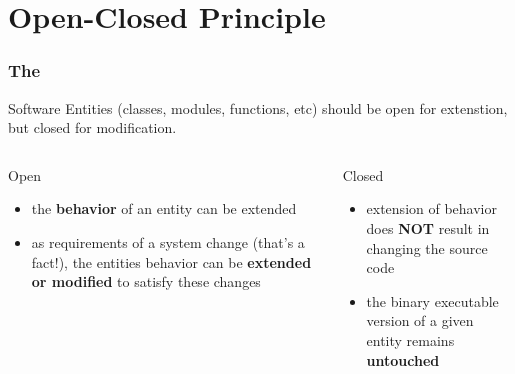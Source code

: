 \documentclass[9pt]{beamer}
\begin{document}
\section{Open-Closed Principle}
\begin{frame}
  \frametitle{The \secname}
  \begin{theorem}
    Software Entities (classes, modules, functions, etc) should be open for extenstion, but closed for modification.
  \end{theorem}
\vfill
\pause
  \begin{columns}[t]
    \begin{column}{.48\textwidth}
       \begin{block}{Open}
         \begin{itemize}
         \item<3-> the \textbf{behavior} of an entity can be extended
         \item<3-> as requirements of a system change (that's a fact!), the entities behavior can be \textbf{extended or modified} to satisfy these changes
         \end{itemize}
       \end{block}
    \end{column}
\hfill
    \begin{column}{.48\textwidth}
       \begin{block}{Closed}
         \begin{itemize}
         \item<4-> extension of behavior does \textbf{NOT} result in changing the source code 
         \item<4-> the binary executable version of a given entity remains \textbf{untouched}
         \end{itemize}
      \end{block}
    \end{column}
  \end{columns}

\end{frame}
\end{document}
